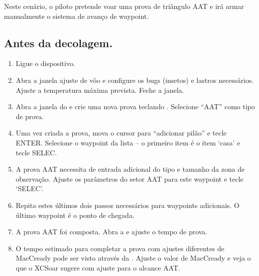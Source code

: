 Neste cenário, o piloto pretende voar uma prova de triângulo AAT e irá armar manualmente o sistema de avanço de waypoint.


\subsection*{Antes da decolagem.}
\begin{enumerate}
\item  Ligue o dispositivo.
\item  Abra a janela ajuste de vôo e configure os bugs (insetos) e lastros necessários.  Ajuste a temperatura máxima prevista.  Feche a janela.
\item Abra a janela do e crie uma nova prova teclando . Selecione “AAT” como tipo de prova.
\item  Uma vez criada a prova, mova o cursor para “adicionar pilão” e tecle ENTER.  Selecione o waypoint da lista – o primeiro item é o item ‘casa’ e tecle SELEC.  
\item  A prova AAT necessita de entrada adicional do tipo e tamanho da zona de observação.  Ajuste os parâmetros do setor AAT para este waypoint e tecle ‘SELEC’.
\item  Repita estes últimos dois passos necessários para waypoints adicionais.  O último waypoint é o ponto de chegada.
\item  A prova AAT foi composta.  Abra a   e ajuste o tempo de prova.
\item  O tempo estimado para completar a prova com ajustes diferentes de MacCready pode ser visto através da  .  Ajuste o valor de MacCready e veja o que o XCSoar sugere com ajuste para o alcance AAT.
\end{enumerate}

